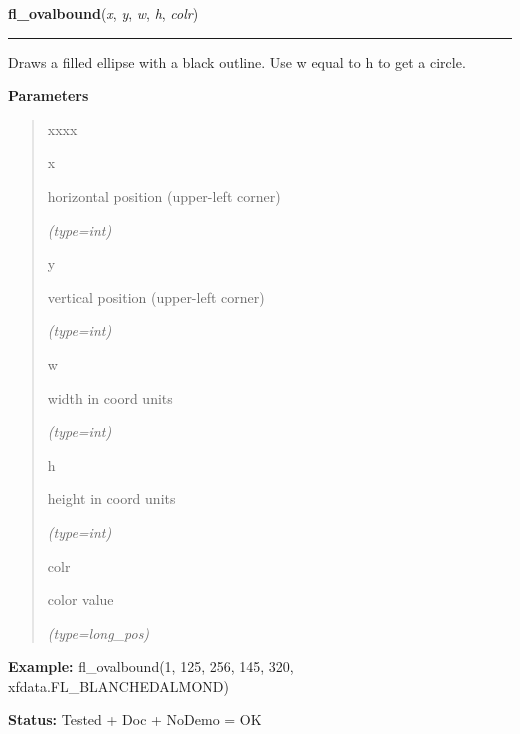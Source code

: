     \label{xformslib:flxbasic:fl_ovalbound}

    \vspace{0.5ex}

\hspace{.8\funcindent}\begin{boxedminipage}{\funcwidth}

    \raggedright \textbf{fl\_ovalbound}(\textit{x}, \textit{y}, \textit{w}, \textit{h}, \textit{colr})

    \vspace{-1.5ex}

    \rule{\textwidth}{0.5\fboxrule}
\setlength{\parskip}{2ex}
    Draws a filled ellipse with a black outline. Use w equal to h to get a 
    circle.

\setlength{\parskip}{1ex}
      \textbf{Parameters}
      \vspace{-1ex}

      \begin{quote}
        \begin{Ventry}{xxxx}

          \item[x]

          horizontal position (upper-left corner)

            {\it (type=int)}

          \item[y]

          vertical position (upper-left corner)

            {\it (type=int)}

          \item[w]

          width in coord units

            {\it (type=int)}

          \item[h]

          height in coord units

            {\it (type=int)}

          \item[colr]

          color value

            {\it (type=long\_pos)}

        \end{Ventry}

      \end{quote}

\textbf{Example:} fl\_ovalbound(1, 125, 256, 145, 320, xfdata.FL\_BLANCHEDALMOND)



\textbf{Status:} Tested + Doc + NoDemo = OK



    \end{boxedminipage}

